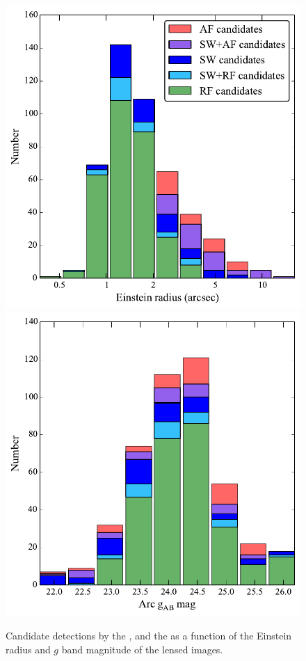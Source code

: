 \documentclass[useAMS,usenatbib,a4paper]{mn2e}
\begin{document}
\begin{figure}
\begin{center}
\includegraphics[scale=0.5]{stacked_lenscand_rein.pdf}
\includegraphics[scale=0.5]{stacked_lenscand_mag.pdf}
\caption{ \label{fig:stackremg}
Candidate detections by the \rf, \sw and the \af as a
function of the Einstein radius and $g$ band magnitude of the lensed
images.
}
\end{center}
\end{figure}
\end{document}
